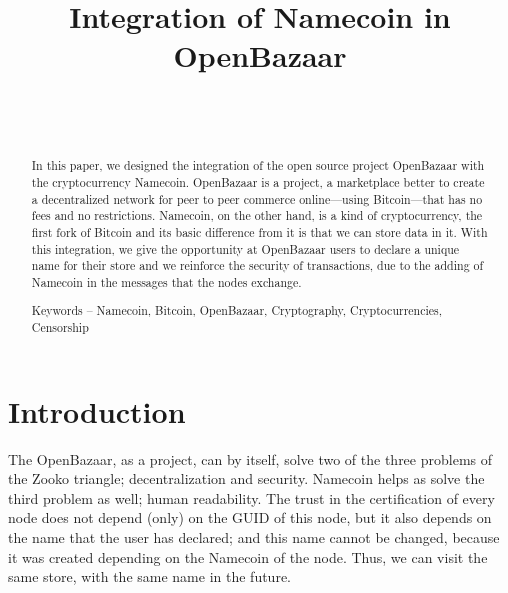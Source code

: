 \documentclass[journal]{IEEEtran}
\begin{document}
\title{Integration of Namecoin in OpenBazaar}
%
%
%

\author{
     \\
    \\
}
\maketitle
{}
\begin{abstract}
In this paper, we designed the integration of the open source project OpenBazaar with the cryptocurrency Namecoin. OpenBazaar is a project, a marketplace better to create a decentralized network for peer to peer commerce online—using Bitcoin—that has no fees and no restrictions. Namecoin, on the other hand, is a kind of cryptocurrency, the first fork of Bitcoin and its basic difference from it is that we can store data in it. With this integration, we give the opportunity at OpenBazaar users to declare a unique name for their store and we reinforce the security of transactions, due to the adding of Namecoin in the messages that the nodes exchange.

Keywords -- Namecoin, Bitcoin, OpenBazaar, Cryptography, Cryptocurrencies, Censorship
\end{abstract}

\IEEEpeerreviewmaketitle
\vspace{-5mm}

\section{Introduction}

The OpenBazaar, as a project, can by itself, solve two of the three problems of the Zooko triangle; decentralization and security. Namecoin helps as solve the third problem as well; human readability. The trust in the certification of every node does not depend (only) on the GUID of this node, but it also depends on the name that the user has declared; and this name cannot be changed, because it was created depending on the Namecoin of the node. Thus, we can visit the same store, with the same name in the future.
\end{document}
